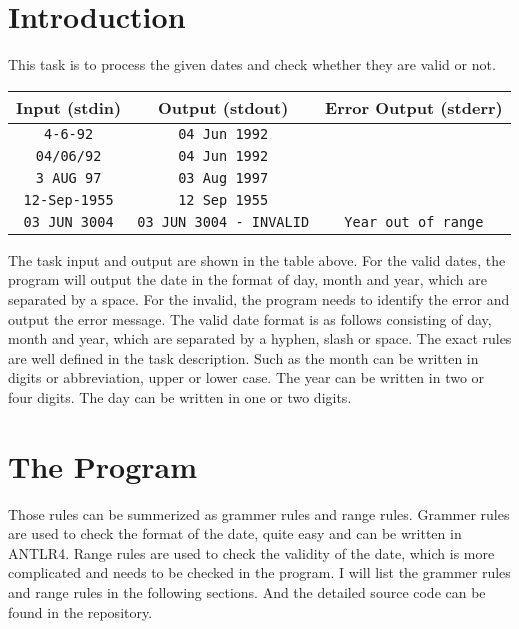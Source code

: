 \documentclass[a4paper,12pt]{article} %
\begin{document}
\section{Introduction} 

This task is to process the given dates and check whether they are valid or not. 

\begin{table}[h]
  \centering
  
  \begin{tabular}{|c|c|c|}
	\hline
	\textbf{Input (stdin)} & \textbf{Output (stdout)} & \textbf{Error Output (stderr)} \\
	\hline
	\texttt {4-6-92} & \texttt {04 Jun 1992} &  \\
	\texttt {04/06/92} & \texttt {04 Jun 1992} &  \\
	\texttt {3 AUG 97} & \texttt {03 Aug 1997} &  \\
	\texttt {12-Sep-1955} & \texttt {12 Sep 1955} &  \\
	\texttt {03 JUN 3004} & \texttt {03 JUN 3004 - INVALID} & \texttt {Year out of range} \\
	\hline
  \end{tabular}
\end{table}

The task input and output are shown in the table above. 
For the valid dates, the program will output the date in the format of 
day, month and year, which are separated by a space.
For the invalid, the program needs to identify the error and output the error message.
The valid date format is as follows consisting of day, month and year,
which are separated by a hyphen, slash or space. 
The exact rules are well defined in the task description. 
Such as the month can be written in digits or abbreviation, upper or lower case.
The year can be written in two or four digits.
The day can be written in one or two digits. 

\section{The Program}

Those rules can be summerized as grammer rules and range rules. 
Grammer rules are used to check the format of the date, quite easy and can be written in ANTLR4. 
Range rules are used to check the validity of the date, which is more complicated and needs to be checked in the program.
I will list the grammer rules and range rules in the following sections. 
And the detailed source code can be found in the repository.
\end{document}
